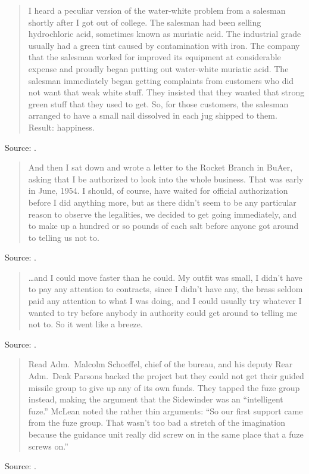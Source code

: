 \documentclass[a4paper]{article}
\begin{document}
\begin{quote}
	I heard a peculiar version of the water-white problem from a salesman shortly after I got out
of college.  The salesman had been selling hydrochloric acid, sometimes known as muriatic acid.
The industrial grade usually had a green tint caused by contamination with iron.  The company that
the salesman worked for improved its equipment at considerable expense and proudly began putting
out water-white muriatic acid.  The salesman immediately began getting complaints from customers
who did not want that weak white stuff.  They insisted that they wanted that strong green stuff
that they used to get.  So, for those customers, the salesman arranged to have a small nail
dissolved in each jug shipped to them.  Result: happiness.
\end{quote}
Source: \cite[p.~103]{Dequasie1991}.
\medskip

\begin{quote}
	And then I sat down and wrote a letter to the Rocket Branch in BuAer, asking that I be
authorized to look into the whole business.  That was early in June, 1954.  I should, of course,
have waited for official authorization before I did anything more, but as there didn't seem to be
any particular reason to observe the legalities, we decided to get going immediately, and to make
up a hundred or so pounds of each salt before anyone got around to telling us not to.
\end{quote}
Source: \cite[p.~138]{Clark1972}.
\medskip

\begin{quote}
	\ldots and I could move faster than he could.  My outfit was small, I didn't have to pay any
attention to contracts, since I didn't have any, the brass seldom paid any attention to what I was
doing, and I could usually try whatever I wanted to try before anybody in authority could get
around to telling me not to.  So it went like a breeze.
\end{quote}
Source: \cite[p.~161]{Clark1972}.
\medskip

\begin{quote}
	Read Adm.\ Malcolm Schoeffel, chief of the bureau, and his deputy Rear Adm.\ Deak Parsons
backed the project but they could not get their guided missile group to give up any of its own
funds.  They tapped the fuze group instead, making the argument that the Sidewinder was an
``intelligent fuze.''  McLean noted the rather thin arguments: ``So our first support came from the
fuze group.  That wasn't too bad a stretch of the imagination because the guidance unit really did
screw on in the same place that a fuze screws on.''
\end{quote}
Source: \cite[pp.~41--2]{Westrum1999}.
\medskip
\end{document}
